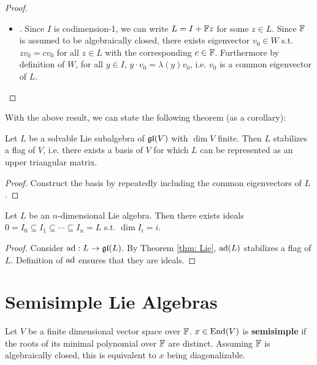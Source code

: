 \documentclass{article}
\begin{document}
\begin{proof}
\begin{itemize}
        \item {}. Since $I$ is codimension-1, we can write $L = I + \mathbb{F} z$ for some $z \in L$. Since $\mathbb{F}$ is assumed to be algebraically closed, there exists eigenvector $v_0 \in W$ s.t. $z v_0 = c v_0$ for all $z \in L$ with the corresponding $c \in \mathbb{F}$. Furthermore by definition of $W$, for all $y \in I$, $y \cdot v_0 = \lambda(y) v_0$, i.e. $v_0$ is a common eigenvector of $L$. 
    \end{itemize}
\end{proof}

\textstart
With the above result, we can state the following theorem (as a corollary):

\begin{theorem}[Lie]\label{thm: Lie}
    Let $L$ be a solvable Lie subalgebra of $\mathfrak{gl}(V)$ with $\dim V$ finite. Then $L$ stabilizes a flag of $V$, i.e. there exists a basis of $V$ for which $L$ can be represented as an upper triangular matrix.
\end{theorem}

\begin{proof}
    Construct the basis by repeatedly including the common eigenvectors of $L$.
\end{proof}

\begin{corollary}
    Let $L$ be an $n$-dimensional Lie algebra. Then there exists ideals $0 = I_0 \subseteq I_1 \subseteq \cdots \subseteq I_n = L$ s.t. $\dim I_i = i$.
\end{corollary}

\begin{proof}
    Consider $\operatorname{ad}: L \to \mathfrak{gl}(L)$. By Theorem \ref{thm: Lie}, $\operatorname{ad}(L)$ stabilizes a flag of $L$. Definition of $\operatorname{ad}$ ensures that they are ideals.
\end{proof}

\section{Semisimple Lie Algebras}

\begin{definition}
    Let $V$ be a finite dimensional vector space over $\mathbb{F}$. $x \in \mathrm{End}(V)$ is \textbf{semisimple} if the roots of its minimal polynomial over $\mathbb{F}$ are distinct. Assuming $\mathbb{F}$ is algebraically closed, this is equivalent to $x$ being diagonalizable.
\end{definition}
\end{document}
